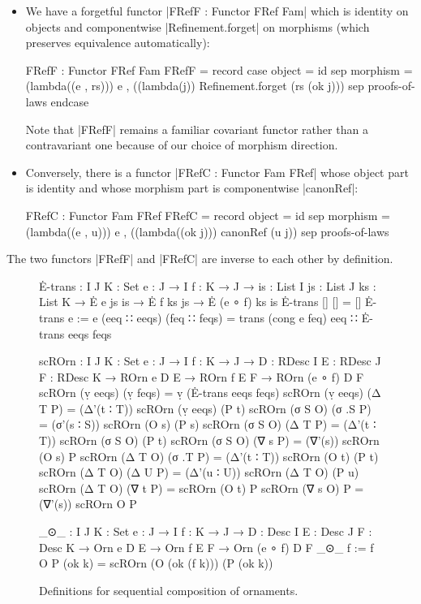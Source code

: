 \begin{itemize}
\item We have a forgetful functor |FRefF : Functor FRef Fam| which is identity on objects and componentwise |Refinement.forget| on morphisms (which preserves equivalence automatically):
\begin{code}
FRefF : Functor FRef Fam
FRefF = record
  case  object     = id
  sep   morphism   = (lambda((e , rs))) e , ((lambda(j)) Refinement.forget (rs (ok j)))
  sep   proofs-of-laws endcase
\end{code}
Note that |FRefF| remains a familiar covariant functor rather than a contravariant one because of our choice of morphism direction.
\item Conversely, there is a functor |FRefC : Functor Fam FRef| whose object part is identity and whose morphism part is componentwise |canonRef|:
\begin{code}
FRefC : Functor Fam FRef
FRefC = record
  {    object    =  id
  sep  morphism  =  (lambda((e , u))) e , ((lambda((ok j))) canonRef (u {j}))
  sep  proofs-of-laws }
\end{code}
\end{itemize}
The two functors |FRefF| and |FRefC| are inverse to each other by definition.

\begin{figure}
\codefigure
\begin{code}
Ė-trans :  {I J K : Set} {e : J → I} {f : K → J} →
           {is : List I} {js : List J} {ks : List K} →
           Ė e js is → Ė f ks js → Ė (e ∘ f) ks is
Ė-trans           []            []            =  []
Ė-trans {e := e}  (eeq ∷ eeqs)  (feq ∷ feqs)  =  trans (cong e feq) eeq ∷
                                                   Ė-trans eeqs feqs

scROrn :  {I J K : Set} {e : J → I} {f : K → J} →
          {D : RDesc I} {E : RDesc J} {F : RDesc K} →
          ROrn e D E → ROrn f E F → ROrn (e ∘ f) D F
scROrn (ṿ eeqs)  (ṿ feqs)  = ṿ (Ė-trans eeqs feqs)
scROrn (ṿ eeqs)  (Δ T P)   = (Δ'(t ∶ T))  scROrn (ṿ eeqs)  (P t)
scROrn (σ S O)   (σ .S P)  = (σ'(s ∶ S))  scROrn (O s)     (P s)
scROrn (σ S O)   (Δ T P)   = (Δ'(t ∶ T))  scROrn (σ S O)   (P t)
scROrn (σ S O)   (∇ s P)   = (∇'(s))      scROrn (O s)     P
scROrn (Δ T O)   (σ .T P)  = (Δ'(t ∶ T))  scROrn (O t)     (P t)
scROrn (Δ T O)   (Δ U P)   = (Δ'(u ∶ U))  scROrn (Δ T O)   (P u)
scROrn (Δ T O)   (∇ t P)   =              scROrn (O t)     P
scROrn (∇ s O)   P         = (∇'(s))      scROrn O         P

_⊙_ :  {I J K : Set} {e : J → I} {f : K → J} →
       {D : Desc I} {E : Desc J} {F : Desc K} →
       Orn e D E → Orn f E F → Orn (e ∘ f) D F
_⊙_ {f := f} O P (ok k) = scROrn (O (ok (f k))) (P (ok k))
\end{code}
\caption{Definitions for sequential composition of ornaments.}
\label{fig:sequential-composition}
\end{figure}

